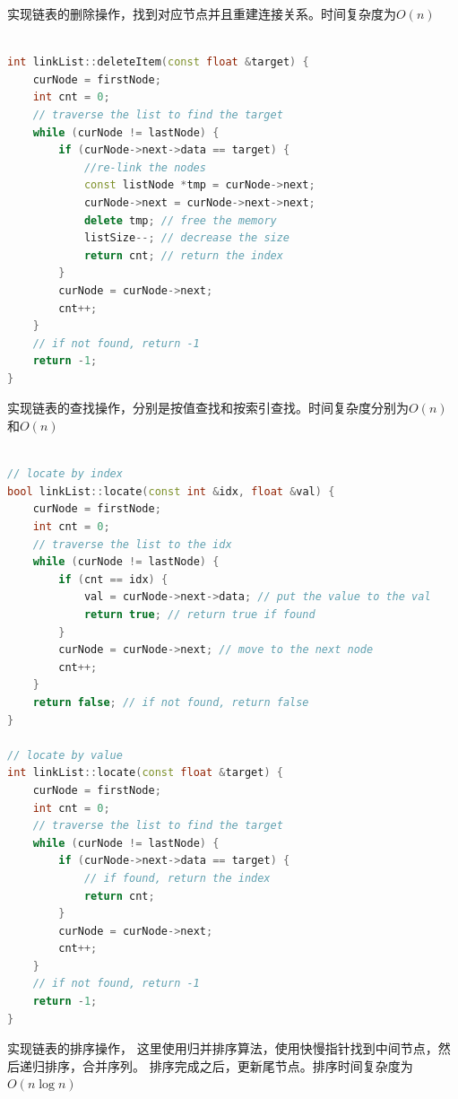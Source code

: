 \documentclass{csexp}
\begin{document}
实现链表的删除操作，找到对应节点并且重建连接关系。时间复杂度为$O(n)$

\begin{lstlisting}[language=C++]

int linkList::deleteItem(const float &target) {
    curNode = firstNode;
    int cnt = 0;
    // traverse the list to find the target
    while (curNode != lastNode) {
        if (curNode->next->data == target) {
            //re-link the nodes
            const listNode *tmp = curNode->next;
            curNode->next = curNode->next->next;
            delete tmp; // free the memory
            listSize--; // decrease the size
            return cnt; // return the index
        }
        curNode = curNode->next;
        cnt++;
    }
    // if not found, return -1
    return -1;
}
\end{lstlisting}

实现链表的查找操作，分别是按值查找和按索引查找。时间复杂度分别为$O(n)$和$O(n)$

\begin{lstlisting}[language=C++]

// locate by index
bool linkList::locate(const int &idx, float &val) {
    curNode = firstNode;
    int cnt = 0;
    // traverse the list to the idx
    while (curNode != lastNode) {
        if (cnt == idx) {
            val = curNode->next->data; // put the value to the val
            return true; // return true if found
        }
        curNode = curNode->next; // move to the next node
        cnt++;
    }
    return false; // if not found, return false
}

// locate by value
int linkList::locate(const float &target) {
    curNode = firstNode;
    int cnt = 0;
    // traverse the list to find the target
    while (curNode != lastNode) {
        if (curNode->next->data == target) {
            // if found, return the index
            return cnt;
        }
        curNode = curNode->next;
        cnt++;
    }
    // if not found, return -1
    return -1;
}
\end{lstlisting}

实现链表的排序操作， 这里使用归并排序算法，使用快慢指针找到中间节点，然后递归排序，合并序列。
排序完成之后，更新尾节点。排序时间复杂度为$O(n\log n)$
\end{document}
